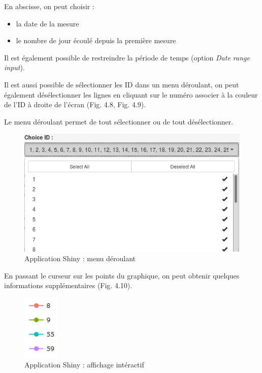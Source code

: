\documentclass[]{report}
\providecommand{\tightlist}{%
  \setlength{\itemsep}{0pt}\setlength{\parskip}{0pt}}
\begin{document}
En abscisse, on peut choisir :

\begin{itemize}
\tightlist
\item
  la date de la mesure
\item
  le nombre de jour écoulé depuis la première mesure
\end{itemize}

Il est également possible de restreindre la période de temps (option
\emph{Date range input}).

Il est aussi possible de sélectionner les ID dans un menu déroulant, on
peut également désélectionner les lignes en cliquant sur le numéro
associer à la couleur de l'ID à droite de l'écran (Fig. 4.8, Fig. 4.9).

Le menu déroulant permet de tout sélectionner ou de tout désélectionner.

\begin{figure}[h!]
\includegraphics[]{../image/menu-deroulant.PNG}
\caption{Application Shiny : menu déroulant}
\end{figure}

En passant le curseur sur les points du graphique, on peut obtenir
quelques informations supplémentaires (Fig. 4.10).

\begin{figure}[h!]
\includegraphics[]{../image/shiny-selection.PNG}
\caption{Application Shiny : affichage intéractif}
\end{figure}
\end{document}
